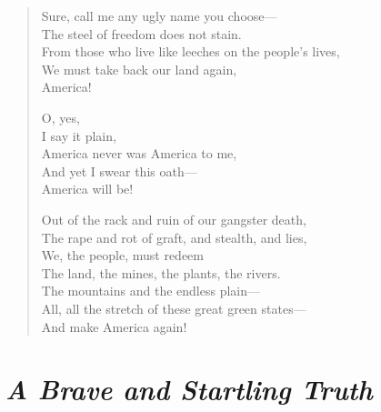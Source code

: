 \documentclass[12pt, openany, letterpaper]{memoir}
\begin{document}
\begin{verse}
	Sure, call me any ugly name you choose—\\
	The steel of freedom does not stain.\\
	From those who live like leeches on the people's lives,\\
	We must take back our land again,\\
	America!
	
	O, yes,\\
	I say it plain,\\
	America never was America to me,\\
	And yet I swear this oath—\\
	America will be!
	
	Out of the rack and ruin of our gangster death,\\
	The rape and rot of graft, and stealth, and lies,\\
	We, the people, must redeem\\
	The land, the mines, the plants, the rivers.\\
	The mountains and the endless plain—\\
	All, all the stretch of these great green states—\\
	And make America again!
\end{verse}

\newpage
{}
\section*{\emph{A Brave and Startling Truth}}
\end{document}
